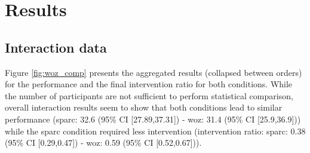\section{Results}

\subsection{Interaction data}

Figure \ref{fig:woz_comp} presents the aggregated results (collapsed between orders) for the performance and the final intervention ratio for both conditions. While the number of participants are not sufficient to perform statistical comparison, overall interaction results seem to show that both conditions lead to similar performance (\gls{sparc}: 32.6 (95\% CI [27.89,37.31]) - \gls{woz}: 31.4 (95\% CI [25.9,36.9])) while the \gls{sparc} condition required less intervention (intervention ratio: \gls{sparc}: 0.38 (95\% CI [0.29,0.47]) - \gls{woz}: 0.59 (95\% CI [0.52,0.67])). 

